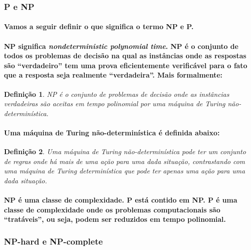 \documentclass[a4paper,10pt]{article}
\theoremstyle{plain}
\newtheorem*{spn-def}{Definição}
\begin{document}
\subsubsection{P e NP}

\paragraph{
  Vamos a seguir definir o que significa o termo NP e P.
}

\paragraph{
  NP significa \textit{nondeterministic polynomial time}. NP é o conjunto de todos os problemas de
  decisão na qual as instâncias onde as respostas são ``verdadeiro''  tem uma prova eficientemente
  verificável para o fato que a resposta seja realmente ``verdadeira''. Mais formalmente:
}

\begin{spn-def} NP é o conjunto de problemas de decisão onde as instâncias verdadeiras são aceitas
  em tempo polinomial por uma máquina de Turing não-determinística.
\end{spn-def}

\paragraph{
  Uma máquina de Turing não-determinística é definida abaixo:
}

\begin{spn-def} Uma máquina de Turing não-determinística pode ter um conjunto de regras onde há
  mais de uma ação para uma dada situação, contrastando com uma máquina de Turing determinística que
  pode ter apenas uma ação para uma dada situação.
\end{spn-def}

\paragraph{
  NP é uma classe de complexidade. P está contido em NP. P é uma classe de complexidade onde os
  problemas computacionais são ``tratáveis'', ou seja, podem ser reduzidos em tempo polinomial.
}

\subsubsection{NP-hard e NP-complete}
\end{document}
